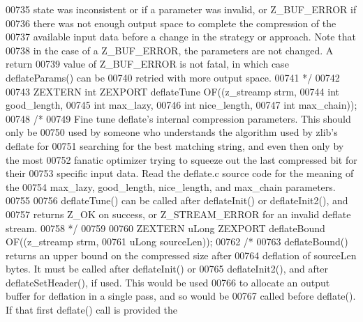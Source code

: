 \begin{DoxyCode}
00735 \textcolor{comment}{   state was inconsistent or if a parameter was invalid, or Z\_BUF\_ERROR if}
00736 \textcolor{comment}{   there was not enough output space to complete the compression of the}
00737 \textcolor{comment}{   available input data before a change in the strategy or approach.  Note that}
00738 \textcolor{comment}{   in the case of a Z\_BUF\_ERROR, the parameters are not changed.  A return}
00739 \textcolor{comment}{   value of Z\_BUF\_ERROR is not fatal, in which case deflateParams() can be}
00740 \textcolor{comment}{   retried with more output space.}
00741 \textcolor{comment}{*/}
00742 
00743 ZEXTERN \textcolor{keywordtype}{int} ZEXPORT deflateTune OF((z\_streamp strm,
00744                                     \textcolor{keywordtype}{int} good\_length,
00745                                     \textcolor{keywordtype}{int} max\_lazy,
00746                                     \textcolor{keywordtype}{int} nice\_length,
00747                                     \textcolor{keywordtype}{int} max\_chain));
00748 \textcolor{comment}{/*}
00749 \textcolor{comment}{     Fine tune deflate's internal compression parameters.  This should only be}
00750 \textcolor{comment}{   used by someone who understands the algorithm used by zlib's deflate for}
00751 \textcolor{comment}{   searching for the best matching string, and even then only by the most}
00752 \textcolor{comment}{   fanatic optimizer trying to squeeze out the last compressed bit for their}
00753 \textcolor{comment}{   specific input data.  Read the deflate.c source code for the meaning of the}
00754 \textcolor{comment}{   max\_lazy, good\_length, nice\_length, and max\_chain parameters.}
00755 \textcolor{comment}{}
00756 \textcolor{comment}{     deflateTune() can be called after deflateInit() or deflateInit2(), and}
00757 \textcolor{comment}{   returns Z\_OK on success, or Z\_STREAM\_ERROR for an invalid deflate stream.}
00758 \textcolor{comment}{ */}
00759 
00760 ZEXTERN uLong ZEXPORT deflateBound OF((z\_streamp strm,
00761                                        uLong sourceLen));
00762 \textcolor{comment}{/*}
00763 \textcolor{comment}{     deflateBound() returns an upper bound on the compressed size after}
00764 \textcolor{comment}{   deflation of sourceLen bytes.  It must be called after deflateInit() or}
00765 \textcolor{comment}{   deflateInit2(), and after deflateSetHeader(), if used.  This would be used}
00766 \textcolor{comment}{   to allocate an output buffer for deflation in a single pass, and so would be}
00767 \textcolor{comment}{   called before deflate().  If that first deflate() call is provided the}

\end{DoxyCode}
